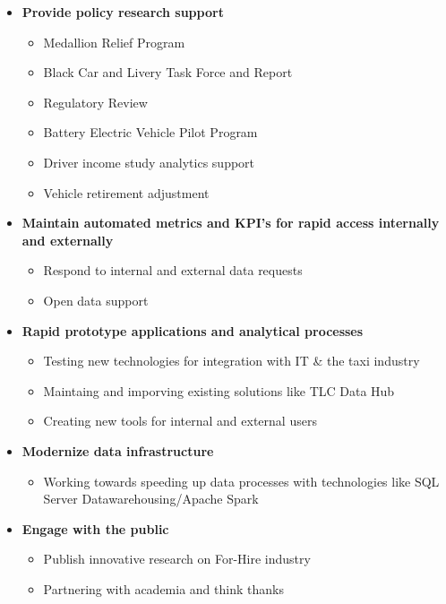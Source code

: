 \documentclass[
]{book}
\providecommand{\tightlist}{%
  \setlength{\itemsep}{0pt}\setlength{\parskip}{0pt}}
\begin{document}
\begin{itemize}
\item
  \textbf{Provide policy research support}

  \begin{itemize}
  \item
    Medallion Relief Program
  \item
    Black Car and Livery Task Force and Report
  \item
    Regulatory Review
  \item
    Battery Electric Vehicle Pilot Program
  \item
    Driver income study analytics support
  \item
    Vehicle retirement adjustment
  \end{itemize}
\item
  \textbf{Maintain automated metrics and KPI's for rapid access internally and externally}

  \begin{itemize}
  \item
    Respond to internal and external data requests
  \item
    Open data support
  \end{itemize}
\item
  \textbf{Rapid prototype applications and analytical processes}

  \begin{itemize}
  \item
    Testing new technologies for integration with IT \& the taxi industry
  \item
    Maintaing and imporving existing solutions like TLC Data Hub
  \item
    Creating new tools for internal and external users
  \end{itemize}
\item
  \textbf{Modernize data infrastructure}

  \begin{itemize}
  \tightlist
  \item
    Working towards speeding up data processes with technologies like SQL Server Datawarehousing/Apache Spark
  \end{itemize}
\item
  \textbf{Engage with the public}

  \begin{itemize}
  \item
    Publish innovative research on For-Hire industry
  \item
    Partnering with academia and think thanks
  \end{itemize}
\end{itemize}
\end{document}
